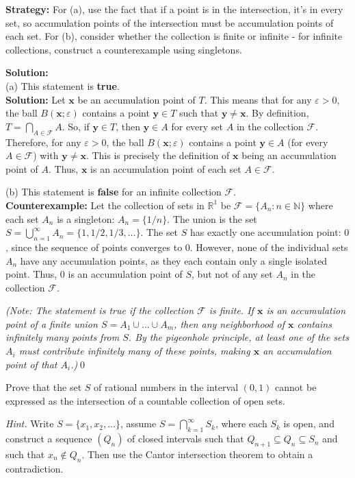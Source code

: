 \noindent\textbf{Strategy:} For (a), use the fact that if a point is in the intersection, it's in every set, so accumulation points of the intersection must be accumulation points of each set. For (b), consider whether the collection is finite or infinite - for infinite collections, construct a counterexample using singletons.

\bigskip\noindent\textbf{Solution:}\\
(a) This statement is \textbf{true}.\\
\bigskip\noindent\textbf{Solution:} Let $\mathbf{x}$ be an accumulation point of $T$. This means that for any $\varepsilon > 0$, the ball $B(\mathbf{x}; \varepsilon)$ contains a point $\mathbf{y} \in T$ such that $\mathbf{y} \neq \mathbf{x}$. By definition, $T = \bigcap_{A \in \mathcal{F}} A$. So, if $\mathbf{y} \in T$, then $\mathbf{y} \in A$ for every set $A$ in the collection $\mathcal{F}$. Therefore, for any $\varepsilon > 0$, the ball $B(\mathbf{x}; \varepsilon)$ contains a point $\mathbf{y} \in A$ (for every $A \in \mathcal{F}$) with $\mathbf{y} \neq \mathbf{x}$. This is precisely the definition of $\mathbf{x}$ being an accumulation point of $A$. Thus, $\mathbf{x}$ is an accumulation point of each set $A \in \mathcal{F}$.

(b) This statement is \textbf{false} for an infinite collection $\mathcal{F}$.\\
\textbf{Counterexample:} Let the collection of sets in $\mathbb{R}^1$ be $\mathcal{F} = \{A_n : n \in \mathbb{N}\}$ where each set $A_n$ is a singleton: $A_n = \{1/n\}$.
The union is the set $S = \bigcup_{n=1}^{\infty} A_n = \{1, 1/2, 1/3, \dots\}$.
The set $S$ has exactly one accumulation point: $0$, since the sequence of points converges to $0$.
However, none of the individual sets $A_n$ have any accumulation points, as they each contain only a single isolated point.
Thus, $0$ is an accumulation point of $S$, but not of any set $A_n$ in the collection $\mathcal{F}$.

\textit{(Note: The statement is true if the collection $\mathcal{F}$ is finite. If $\mathbf{x}$ is an accumulation point of a finite union $S = A_1 \cup \dots \cup A_m$, then any neighborhood of $\mathbf{x}$ contains infinitely many points from $S$. By the pigeonhole principle, at least one of the sets $A_i$ must contribute infinitely many of these points, making $\mathbf{x}$ an accumulation point of that $A_i$.)}\qed


\begin{problembox}
Prove that the set \( S \) of rational numbers in the interval \( (0, 1) \) cannot be expressed as the intersection of a countable collection of open sets. 

\textit{Hint.} Write \( S = \{x_1, x_2, \ldots\} \), assume \( S = \bigcap_{k=1}^{\infty} S_k \), where each \( S_k \) is open, and construct a sequence \( (Q_n) \) of closed intervals such that \( Q_{n+1} \subseteq Q_n \subseteq S_n \) and such that \( x_n \notin Q_n \). Then use the Cantor intersection theorem to obtain a contradiction.
\end{problembox}

